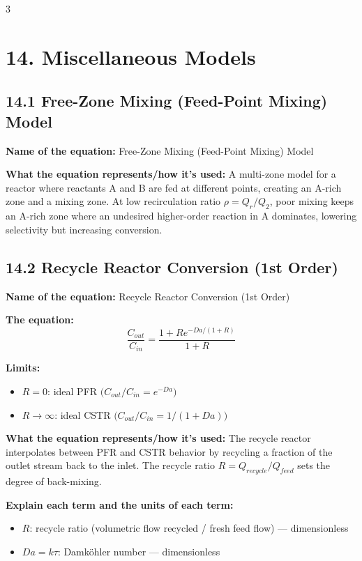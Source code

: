 \documentclass[8pt]{extarticle}
\begin{document}
\begin{multicols*}{3}
\section*{14. Miscellaneous Models}

\subsection*{14.1 Free-Zone Mixing (Feed-Point Mixing) Model}

\textbf{Name of the equation:} Free-Zone Mixing (Feed-Point Mixing) Model

\textbf{What the equation represents/how it's used:} A multi-zone model for a reactor where reactants A and B are fed at different points, creating an A-rich zone and a mixing zone. At low recirculation ratio \(\rho=Q_r/Q_2\), poor mixing keeps an A-rich zone where an undesired higher-order reaction in A dominates, lowering selectivity but increasing conversion.

\subsection*{14.2 Recycle Reactor Conversion (1st Order)}

\textbf{Name of the equation:} Recycle Reactor Conversion (1st Order)

\textbf{The equation:}
\[
\frac{C_{out}}{C_{in}}
=
\frac{1+Re^{-Da/(1+R)}}{1+R}
\]

\textbf{Limits:}
\begin{itemize}
\item \(R=0\): ideal PFR \(\big(C_{out}/C_{in}=e^{-Da}\big)\)
\item \(R\to\infty\): ideal CSTR \(\big(C_{out}/C_{in}=1/(1+Da)\big)\)
\end{itemize}

\textbf{What the equation represents/how it's used:} The recycle reactor interpolates between PFR and CSTR behavior by recycling a fraction of the outlet stream back to the inlet. The recycle ratio \(R=Q_{recycle}/Q_{feed}\) sets the degree of back-mixing.

\textbf{Explain each term and the units of each term:}
\begin{itemize}
\item \(R\): recycle ratio (volumetric flow recycled / fresh feed flow) --- dimensionless
\item \(Da=k\tau\): Damk\"ohler number --- dimensionless
\end{itemize}

\end{multicols*}
\end{document}
